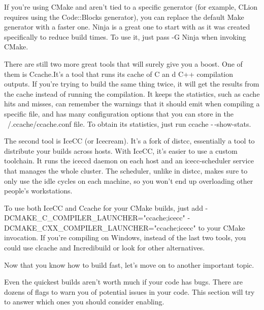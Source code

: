 If you're using CMake and aren't tied to a specific generator (for example, CLion requires using the Code::Blocks generator), you can replace the default Make generator with a faster one. Ninja is a great one to start with as it was created specifically to reduce build times. To use it, just pass -G Ninja when invoking CMake.

There are still two more great tools that will surely give you a boost. One of them is Ccache.It's a tool that runs its cache of C an d C++ compilation outputs. If you're trying to build the same thing twice, it will get the results from the cache instead of running the compilation. It keeps the statistics, such as cache hits and misses, can remember the warnings that it should emit when compiling a specific file, and has many configuration options that you can store in the ~/.ccache/ccache.conf file. To obtain its statistics, just run ccache -\,-show-stats.

The second tool is IceCC (or Icecream). It's a fork of distcc, essentially a tool to distribute your builds across hosts. With IceCC, it's easier to use a custom toolchain. It runs the iceccd daemon on each host and an icecc-scheduler service that manages the whole cluster. The scheduler, unlike in distcc, makes sure to only use the idle cycles on each machine, so you won't end up overloading other people's workstations.

To use both IceCC and Ccache for your CMake builds, just add -DCMAKE\_C\_COMPILER\_LAUNCHER="ccache;icecc" -DCMAKE\_CXX\_COMPILER\_LAUNCHER="ccache;icecc" to your CMake invocation. If you're compiling on Windows, instead of the last two tools, you could use clcache and Incredibuild or look for other alternatives.

Now that you know how to build fast, let's move on to another important topic.


Even the quickest builds aren't worth much if your code has bugs. There are dozens of flags to warn you of potential issues in your code. This section will try to answer which ones you should consider enabling.

